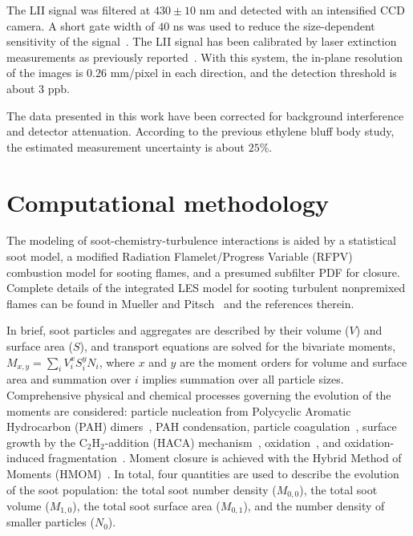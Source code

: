 \documentclass[review,3p,times]{elsarticle}
\begin{document}
The LII signal was filtered at $430 \pm 10$ nm and detected with an intensified CCD camera.  A short gate width of $40$ ns was used to reduce the size-dependent sensitivity of the signal~\cite{bladh08}.  The LII signal has been calibrated by laser extinction measurements as previously reported~\cite{mueller13}.  With this system, the in-plane resolution of the images is $0.26$ mm/pixel in each direction, and the detection threshold is about $3$ ppb.

The data presented in this work have been corrected for background interference and detector attenuation.  According to the previous ethylene bluff body study, the estimated measurement uncertainty is about $25$\%.  

 

\section{Computational methodology} \label{sec:computation}


The modeling of soot-chemistry-turbulence interactions is aided by a statistical soot model, a modified Radiation Flamelet/Progress Variable (RFPV) combustion model for sooting flames, and a presumed subfilter PDF for closure.  Complete details of the integrated LES model for sooting turbulent nonpremixed flames can be found in Mueller and Pitsch~\cite{mueller12} and the references therein.

In brief, soot particles and aggregates are described by their volume ($V$) and surface area ($S$), and transport equations are solved for the bivariate moments, $M_{x,y} = \sum_i{V_i^x S_i^y N_i}$, where $x$ and $y$ are the moment orders for volume and surface area and summation over $i$ implies summation over all particle sizes.  Comprehensive physical and chemical processes governing the evolution of the moments are considered: particle nucleation from Polycyclic Aromatic Hydrocarbon (PAH) dimers~\cite{schuetz02,wong09,blanquart09c}, PAH condensation, particle coagulation~\cite{mueller09b}, surface growth by the C$_2$H$_2$-addition (HACA) mechanism~\cite{frenklach91}, oxidation~\cite{kazakov95,neoh81}, and oxidation-induced fragmentation~\cite{mueller11a}.  Moment closure is achieved with the Hybrid Method of Moments (HMOM)~\cite{mueller09b}.  In total, four quantities are used to describe the evolution of the soot population: the total soot number density ($M_{0,0}$), the total soot volume ($M_{1,0}$), the total soot surface area ($M_{0,1}$), and the number density of smaller particles ($N_0$).
\end{document}

